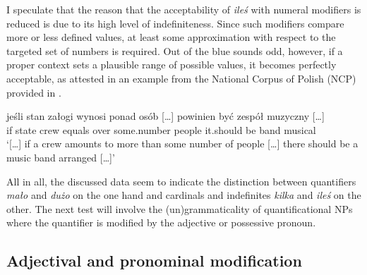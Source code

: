 \documentclass[output=paper,
]{langscibook}
\begin{document}
\begin{multicols}{2}		
		\ea \label{ex:numeral-modifiers-iles} \label{ex:numeral-modifiers-iles-ponad}
	\columnbreak
		\z
        \z

	\end{multicols}
	
	\noindent I speculate that the reason that the acceptability of \textit{ileś} with numeral modifiers is reduced is due to its high level of indefiniteness. Since such modifiers compare more or less defined values, at least some approximation with respect to the targeted set of numbers is required. Out of the blue  sounds odd, however, if a proper context sets a plausible range of possible values, it becomes perfectly acceptable, as attested in an example from the National Corpus of Polish (NCP) provided in .
	
	\ea \gll [\dots] jeśli stan załogi wynosi ponad  osób [\dots] powinien być zespół muzyczny [\dots]\\
	{} if state crew equals over some.number people {} it.should be band musical\\
	\glt `[\dots] if a crew amounts to more than some number of people [\dots] there should be a music band arranged [\dots]'\label{ex:numeral-modifiers-iles-ncp}
    \z
	
\noindent	All in all, the discussed data seem to indicate the distinction between quantifiers \textit{mało} and \textit{dużo} on the one hand and cardinals and indefinites \textit{kilka} and \textit{ileś} on the other. The next test will involve the (un)grammaticality of quantificational NPs where the quantifier is modified by the adjective or possessive pronoun.
	
	\subsection{Adjectival and pronominal modification}\label{sec:adjectival-and pronominal-modification}
	
\end{document}
